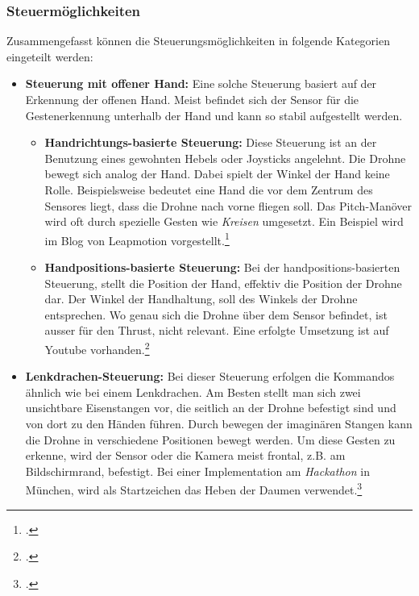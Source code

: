 \subsubsection{Steuermöglichkeiten}
Zusammengefasst können die Steuerungsmöglichkeiten in folgende Kategorien eingeteilt werden:
\begin{itemize}

	\item \textbf{Steuerung mit offener Hand:}
	Eine solche Steuerung basiert auf der Erkennung der offenen Hand.
	Meist befindet sich der Sensor für die Gestenerkennung unterhalb der Hand und kann so stabil aufgestellt werden.
	
		\begin{itemize}
			
			\item \textbf{Handrichtungs-basierte Steuerung:}
			Diese Steuerung ist an der Benutzung eines gewohnten Hebels oder Joysticks angelehnt. Die Drohne bewegt sich analog der Hand. Dabei spielt der Winkel der Hand keine Rolle.
			Beispielsweise bedeutet eine Hand die vor dem Zentrum des Sensores liegt, dass die Drohne nach vorne fliegen soll. Das Pitch-Manöver wird oft durch spezielle Gesten wie \textit{Kreisen} umgesetzt.
			Ein Beispiel wird im Blog von Leapmotion vorgestellt.\footcite{The_Beginning_of_a_Drone_Revolution_Leap_Motion_Blog_2015-04-29}

			\item \textbf{Handpositions-basierte Steuerung:} 
			Bei der handpositions-basierten Steuerung, stellt die Position der Hand, effektiv die Position der Drohne dar. Der Winkel der Handhaltung, soll des Winkels der Drohne entsprechen.
			Wo genau sich die Drohne über dem Sensor befindet, ist ausser für den Thrust, nicht relevant.
			Eine erfolgte Umsetzung ist auf Youtube vorhanden.\footcite{Flying_the_Crazyflie_with_Leap_Motion_YouTube_2015-04-29}
		\end{itemize}

	\item \textbf{Lenkdrachen-Steuerung:} 
	Bei dieser Steuerung erfolgen die Kommandos ähnlich wie bei einem Lenkdrachen.
	Am Besten stellt man sich zwei unsichtbare Eisenstangen vor, die seitlich an der Drohne befestigt sind und von dort zu den Händen führen. Durch bewegen der imaginären Stangen kann die Drohne in verschiedene Positionen bewegt werden.
	Um diese Gesten zu erkenne, wird der Sensor oder die Kamera meist frontal, z.B. am Bildschirmrand, befestigt.
	Bei einer Implementation am \textit{Hackathon} in München, wird als Startzeichen das Heben der Daumen verwendet.\footcite{Drones_Fly_Hands_Free_with_Gestural_Technology_2015-04-29}
	

\end{itemize}
